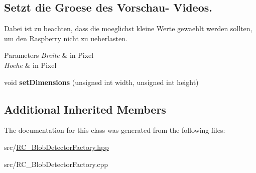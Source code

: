 \subsection*{Setzt die Groese des Vorschau-\/ Videos.}
\label{_amgrp31fff75453dbcfb0cbda6f83097f2790}%
Dabei ist zu beachten, dass die moeglichst kleine Werte gewaehlt werden sollten, um den Raspberry nicht zu ueberlasten.


\begin{DoxyParams}{Parameters}
{\em Breite} & in Pixel \\
\hline
{\em Hoehe} & in Pixel \\
\hline
\end{DoxyParams}
\begin{DoxyCompactItemize}
\item 
\hypertarget{classrc_1_1BlobDetectorFactory_a4bf955ad08f9218729777737b9071e35}{void {\bfseries set\+Dimensions} (unsigned int width, unsigned int height)}\label{classrc_1_1BlobDetectorFactory_a4bf955ad08f9218729777737b9071e35}

\end{DoxyCompactItemize}
\subsection*{Additional Inherited Members}


The documentation for this class was generated from the following files\+:\begin{DoxyCompactItemize}
\item 
src/\hyperlink{RC__BlobDetectorFactory_8hpp}{R\+C\+\_\+\+Blob\+Detector\+Factory.\+hpp}\item 
src/R\+C\+\_\+\+Blob\+Detector\+Factory.\+cpp\end{DoxyCompactItemize}
